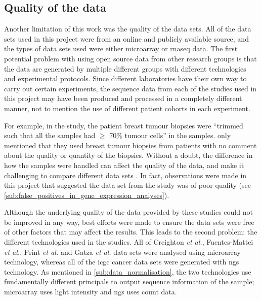 \subsection{Quality of the data}
\label{sub:quality_of_the_data}

Another limitation of this work was the quality of the data sets.
All of the data sets used in this project were from an online and publicly available source, and the types of data sets used were either microarray or \gls{rnaseq} data.
The first potential problem with using open source data from other research groups is that the data are generated by multiple different groups with different technologies and experimental protocols.
Since different laboratories have their own way to carry out certain experiments, the sequence data from each of the studies used in this project may have been produced and processed in a completely different manner, not to mention the use of different patient cohorts in each experiment.

For example, in the \citet{Creighton2012} study, the patient breast tumour biopsies were ``trimmed such that all the samples had $\geq$ 70\% tumour cells'' in the samples.
\citet{Fuentes-Mattei2014} only mentioned that they used breast tumour biopsies from patients with no comment about the quality or quantity of the biopsies.
Without a doubt, the difference in how the samples were handled can affect the quality of the data, and make it challenging to compare different data sets \citep{Irizarry2005}.
In fact, observations were made in this project that suggested the data set from the \citet{Creighton2012} study was of poor quality (see \cref{sub:false_positives_in_gene_expression_analyses}).

Although the underlying quality of the data provided by these studies could not be improved in any way, best efforts were made to  ensure the data sets were free of other factors that may affect the results.
This leads to the second problem: the different technologies used in the studies.
All of Creighton \textit{et al.}, Fuentes-Mattei \textit{et al.}, Print \textit{et al.} and Gatza \textit{et al.} data sets were analysed using microarray technology, whereas all of the \gls{icgc} cancer data sets were generated with \gls{ngs} technology.
As mentioned in \cref{sub:data_normalisation}, the two technologies use fundamentally different principals to output sequence information of the sample; microarray uses light intensity and \gls{ngs} uses count data.

